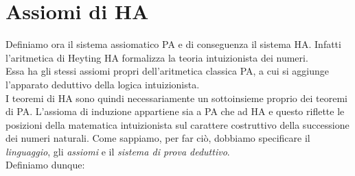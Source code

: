 \section{Assiomi di HA}
Definiamo ora il sistema assiomatico PA e di conseguenza il sistema HA. Infatti l'aritmetica di Heyting HA formalizza la teoria intuizionista dei numeri.\\ Essa ha gli stessi assiomi propri dell'aritmetica classica PA, a cui si aggiunge l'apparato deduttivo della logica intuizionista. \\I teoremi di HA sono quindi necessariamente un sottoinsieme proprio dei teoremi di PA. L'assioma di induzione appartiene sia a PA che ad HA e questo riflette le posizioni della matematica intuizionista sul carattere costruttivo della successione dei numeri naturali. Come sappiamo, per far ci\`o, dobbiamo specificare il \textsl{linguaggio}, gli \textsl{assiomi} e il \textsl{sistema di prova deduttivo}.\\
Definiamo dunque:
